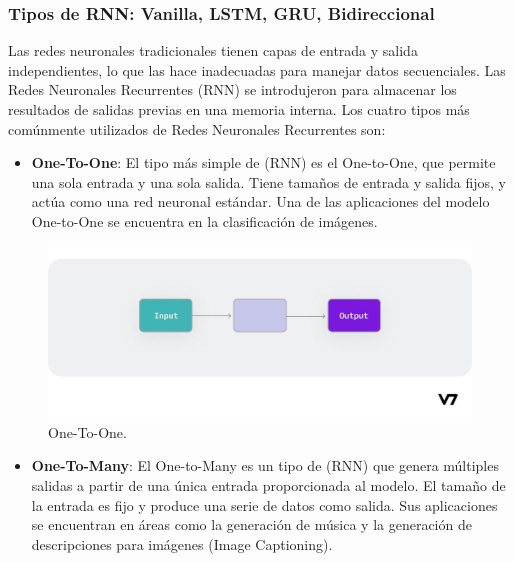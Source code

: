 \documentclass{article}
\begin{document}
\newpage

\subsubsection{Tipos de RNN: Vanilla, LSTM, GRU, Bidireccional}
Las redes neuronales tradicionales tienen capas de entrada y salida independientes, lo que las hace inadecuadas para manejar datos secuenciales.
Las Redes Neuronales Recurrentes (RNN) se introdujeron para almacenar los resultados de salidas previas en una memoria interna.
Los cuatro tipos más comúnmente utilizados de Redes Neuronales Recurrentes son:

\begin{itemize}
    \item \textbf{One-To-One}: El tipo más simple de (RNN) es el One-to-One, que permite una sola entrada y una sola salida. Tiene tamaños de entrada y salida fijos, y actúa como una red neuronal estándar. Una de las aplicaciones del modelo One-to-One se encuentra en la clasificación de imágenes.
\end{itemize}

\begin{figure}[H]
    \centering
    \includegraphics[scale=0.25]{oto.jpeg}
    \caption{One-To-One.}
\end{figure}

\begin{itemize}
    \item \textbf{One-To-Many}: El One-to-Many es un tipo de (RNN) que genera múltiples salidas a partir de una única entrada proporcionada al modelo. El tamaño de la entrada es fijo y produce una serie de datos como salida. Sus aplicaciones se encuentran en áreas como la generación de música y la generación de descripciones para imágenes (Image Captioning).
\end{itemize}
\end{document}
